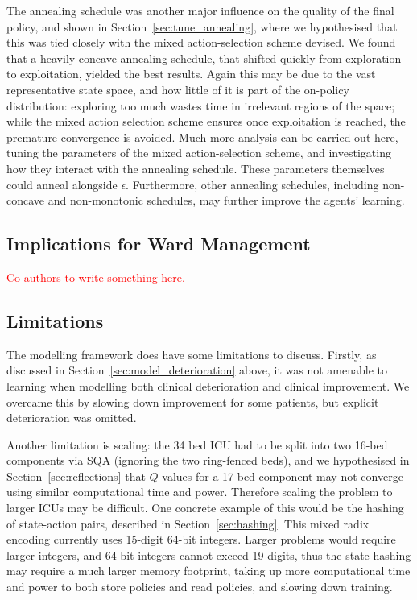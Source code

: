 \documentclass{article}
\begin{document}
The annealing schedule was another major influence on the quality of the final
policy, and shown in Section~\ref{sec:tune_annealing}, where we hypothesised
that this was tied closely with the mixed action-selection scheme devised.
We found that a heavily concave annealing schedule, that shifted quickly from
exploration to exploitation, yielded the best results.
Again this may be due to the vast representative state space, and how little of
it is part of the on-policy distribution: exploring too much wastes time in
irrelevant regions of the space; while the mixed action selection scheme ensures
once exploitation is reached, the premature convergence is avoided.
Much more analysis can be carried out here, tuning the parameters of the mixed
action-selection scheme, and investigating how they interact with the annealing
schedule.
These parameters themselves could anneal alongside $\epsilon$.
Furthermore, other annealing schedules, including non-concave and non-monotonic
schedules, may further improve the agents' learning.


\subsection{Implications for Ward Management}
\textcolor{red}{Co-authors to write something here.}

\subsection{Limitations}
The modelling framework does have some limitations to discuss.
Firstly, as discussed in Section~\ref{sec:model_deterioration} above, it was not
amenable to learning when modelling both clinical deterioration and clinical 
improvement.
We overcame this by slowing down improvement for some patients, but explicit
deterioration was omitted.

Another limitation is scaling: the 34 bed ICU had to be split into two 16-bed
components via SQA (ignoring the two ring-fenced beds), and we hypothesised in
Section~\ref{sec:reflections} that $Q$-values for a 17-bed component may not
converge using similar computational time and power.
Therefore scaling the problem to larger ICUs may be difficult.
One concrete example of this would be the hashing of state-action pairs,
described in Section~\ref{sec:hashing}.
This mixed radix encoding currently uses 15-digit 64-bit integers.
Larger problems would require larger integers, and 64-bit integers cannot exceed 
19 digits, thus the state hashing may require a much larger memory footprint,
taking up more computational time and power to both store policies and read
policies, and slowing down training.
\end{document}
